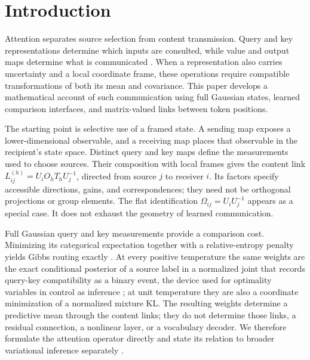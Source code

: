 \documentclass[twoside,11pt]{article}
\begin{document}
\section{Introduction}

Attention separates source selection from content transmission. Query and key representations determine which inputs are consulted, while value and output maps determine what is communicated \citep{vaswani2017attention}. When a representation also carries uncertainty and a local coordinate frame, these operations require compatible transformations of both its mean and covariance. This paper develops a mathematical account of such communication using full Gaussian states, learned comparison interfaces, and matrix-valued links between token positions.

The starting point is selective use of a framed state. A sending map exposes a lower-dimensional observable, and a receiving map places that observable in the recipient's state space. Distinct query and key maps define the measurements used to choose sources. Their composition with local frames gives the content link
\(L_{ij}^{(h)}=U_iO_hT_hU_j^{-1}\), directed from source \(j\) to receiver \(i\).
Its factors specify accessible directions, gains, and correspondences; they need not be orthogonal projections or group elements. The flat identification \(\Omega_{ij}=U_iU_j^{-1}\) appears as a special case. It does not exhaust the geometry of learned communication.

Full Gaussian query and key measurements provide a comparison cost. Minimizing its categorical expectation together with a relative-entropy penalty yields Gibbs routing exactly \citep{Niculae2017Regularized}. At every positive temperature the same weights are the exact conditional posterior of a source label in a normalized joint that records query-key compatibility as a binary event, the device used for optimality variables in control as inference \citep{Levine2018}; at unit temperature they are also a coordinate minimization of a normalized mixture KL. The resulting weights determine a predictive mean through the content links; they do not determine those links, a residual connection, a nonlinear layer, or a vocabulary decoder. We therefore formulate the attention operator directly and state its relation to broader variational inference separately \citep{Blei2017}.
\end{document}
